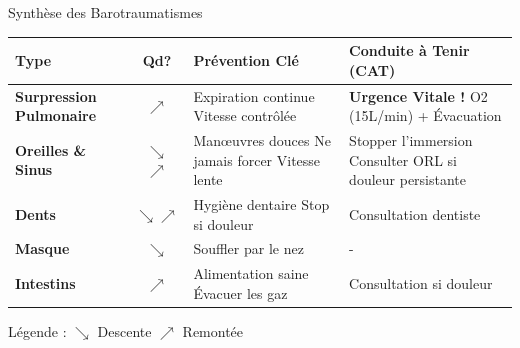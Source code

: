 \begin{frame}{Synthèse des Barotraumatismes}
    \centering
    \renewcommand{\arraystretch}{1.4} %
    \footnotesize %
    
    \begin{table}[]
        \begin{tabular}{p{2cm} c p{3.5cm} p{3.5cm}}
        \toprule
        \textbf{Type} & \textbf{Qd?} & \textbf{Prévention Clé} & \textbf{Conduite à Tenir (CAT)} \\ 
        \midrule
        
        \textbf{Surpression Pulmonaire} & $\nearrow$ & 
        Expiration continue \newline Vitesse contrôlée & 
        \textbf{Urgence Vitale !} \newline O2 (15L/min) + Évacuation \\ 
        \hline
        
        \textbf{Oreilles \newline \& Sinus} & $\searrow$ \newline $\nearrow$ & 
        Manœuvres douces \newline Ne jamais forcer \newline Vitesse lente & 
        Stopper l'immersion \newline Consulter ORL si douleur persistante \\ 
        \hline
        
        \textbf{Dents} & $\searrow \nearrow$ & 
        Hygiène dentaire \newline Stop si douleur & 
        Consultation dentiste \\ 
        \hline
        
        \textbf{Masque} & $\searrow$ & 
        Souffler par le nez & 
        - \\ 
        \hline
        
        \textbf{Intestins} & $\nearrow$ & 
        Alimentation saine \newline Évacuer les gaz & 
        Consultation si douleur \\ 
        
        \bottomrule
        \end{tabular}
    \end{table}

    \vspace{0.2cm}
    \scriptsize{Légende : $\searrow$ Descente \quad $\nearrow$ Remontée}
\end{frame}